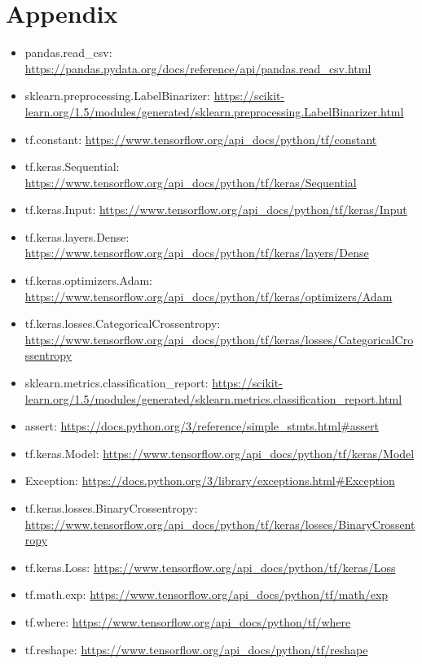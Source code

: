 \documentclass[11pt, a4paper]{article}
\begin{document}
\section*{Appendix}

\begin{itemize}  
	\item pandas.read\_csv: \url{https://pandas.pydata.org/docs/reference/api/pandas.read_csv.html}
	\item sklearn.preprocessing.LabelBinarizer: \url{https://scikit-learn.org/1.5/modules/generated/sklearn.preprocessing.LabelBinarizer.html}
	\item tf.constant: \url{https://www.tensorflow.org/api_docs/python/tf/constant}
	\item tf.keras.Sequential: \url{https://www.tensorflow.org/api_docs/python/tf/keras/Sequential}
	\item tf.keras.Input: \url{https://www.tensorflow.org/api_docs/python/tf/keras/Input}
	\item tf.keras.layers.Dense: \url{https://www.tensorflow.org/api_docs/python/tf/keras/layers/Dense}
	\item tf.keras.optimizers.Adam: \url{https://www.tensorflow.org/api_docs/python/tf/keras/optimizers/Adam}
	\item tf.keras.losses.CategoricalCrossentropy: \url{https://www.tensorflow.org/api_docs/python/tf/keras/losses/CategoricalCrossentropy}
	\item sklearn.metrics.classification\_report: \url{https://scikit-learn.org/1.5/modules/generated/sklearn.metrics.classification_report.html}
	\item assert: \url{https://docs.python.org/3/reference/simple_stmts.html#assert}
	\item tf.keras.Model: \url{https://www.tensorflow.org/api_docs/python/tf/keras/Model}
	\item Exception: \url{https://docs.python.org/3/library/exceptions.html#Exception}
	\item tf.keras.losses.BinaryCrossentropy: \url{https://www.tensorflow.org/api_docs/python/tf/keras/losses/BinaryCrossentropy}
	\item tf.keras.Loss: \url{https://www.tensorflow.org/api_docs/python/tf/keras/Loss}
	\item tf.math.exp: \url{https://www.tensorflow.org/api_docs/python/tf/math/exp}
	\item tf.where: \url{https://www.tensorflow.org/api_docs/python/tf/where}
	\item tf.reshape: \url{https://www.tensorflow.org/api_docs/python/tf/reshape}

\end{itemize}
\end{document}
